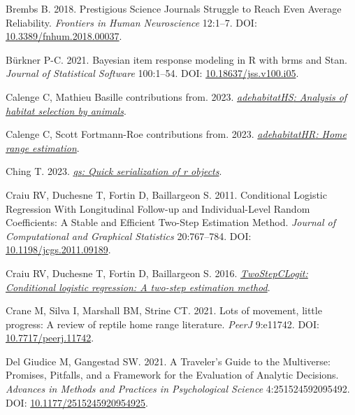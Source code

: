 \documentclass[10pt,a4paper]{article}
\newlength{\cslhangindent}
\newenvironment{CSLReferences}[2] %
 {\begin{list}{}{%
  \setlength{\itemindent}{0pt}
  \setlength{\leftmargin}{0pt}
  \setlength{\parsep}{0pt}
  \ifodd #1
   \setlength{\leftmargin}{\cslhangindent}
   \setlength{\itemindent}{-1\cslhangindent}
  \fi
  \setlength{\itemsep}{#2\baselineskip}}}
 {\end{list}}
\begin{document}
\begin{CSLReferences}{1}{0}
Brembs B. 2018. Prestigious {Science} {Journals} {Struggle} to {Reach} {Even} {Average} {Reliability}. \emph{Frontiers in Human Neuroscience} 12:1--7. DOI: \href{https://doi.org/10.3389/fnhum.2018.00037}{10.3389/fnhum.2018.00037}.

Bürkner P-C. 2021. Bayesian item response modeling in {R} with {brms} and {Stan}. \emph{Journal of Statistical Software} 100:1--54. DOI: \href{https://doi.org/10.18637/jss.v100.i05}{10.18637/jss.v100.i05}.

Calenge C, Mathieu Basille contributions from. 2023. \emph{\href{https://CRAN.R-project.org/package=adehabitatHS}{{adehabitatHS}: Analysis of habitat selection by animals}}.

Calenge C, Scott Fortmann-Roe contributions from. 2023. \emph{\href{https://CRAN.R-project.org/package=adehabitatHR}{{adehabitatHR}: Home range estimation}}.

Ching T. 2023. \emph{\href{https://CRAN.R-project.org/package=qs}{{qs}: Quick serialization of r objects}}.

Craiu RV, Duchesne T, Fortin D, Baillargeon S. 2011. Conditional {Logistic} {Regression} {With} {Longitudinal} {Follow}-up and {Individual}-{Level} {Random} {Coefficients}: {A} {Stable} and {Efficient} {Two}-{Step} {Estimation} {Method}. \emph{Journal of Computational and Graphical Statistics} 20:767--784. DOI: \href{https://doi.org/10.1198/jcgs.2011.09189}{10.1198/jcgs.2011.09189}.

Craiu RV, Duchesne T, Fortin D, Baillargeon S. 2016. \emph{\href{https://CRAN.R-project.org/package=TwoStepCLogit}{TwoStepCLogit: Conditional logistic regression: A two-step estimation method}}.

Crane M, Silva I, Marshall BM, Strine CT. 2021. Lots of movement, little progress: A review of reptile home range literature. \emph{PeerJ} 9:e11742. DOI: \href{https://doi.org/10.7717/peerj.11742}{10.7717/peerj.11742}.

Del Giudice M, Gangestad SW. 2021. A {Traveler}'s {Guide} to the {Multiverse}: {Promises}, {Pitfalls}, and a {Framework} for the {Evaluation} of {Analytic} {Decisions}. \emph{Advances in Methods and Practices in Psychological Science} 4:251524592095492. DOI: \href{https://doi.org/10.1177/2515245920954925}{10.1177/2515245920954925}.


\end{CSLReferences}
\end{document}
